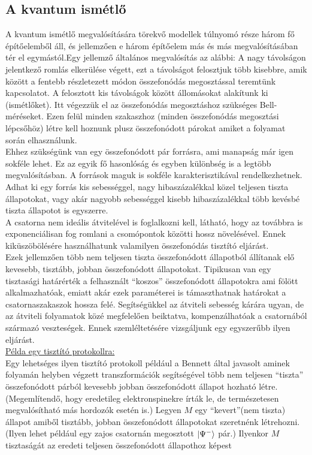 \subsection{A kvantum ismétlő}
A kvantum ismétlő megvalósítására törekvő modellek túlnyomó része három fő építőelemből áll, és jellemzően e három építőelem más és más megvalósításában tér el egymástól.Egy jellemző általános megvalósítás az alábbi:
A nagy távolságon jelentkező romlás elkerülése végett, ezt a távolságot felosztjuk több kisebbre, amik között a fentebb részletezett módon összefonódás megosztással teremtünk kapcsolatot. A felosztott kis távolságok között állomásokat alakítunk ki (ismétlőket). Itt végezzük el az összefonódás megosztáshoz szükséges Bell-méréseket. Ezen felül minden szakaszhoz (minden összefonódás megosztási lépcsőhöz) létre kell hoznunk plusz összefonódott párokat amiket a folyamat során elhasználunk.\\
 Ehhez szükségünk van egy összefonódott pár forrásra, ami manapság már igen sokféle lehet. %
Ez az egyik fő hasonlóság és egyben különbség is a legtöbb megvalósításban. A források maguk is sokféle karakterisztikával rendelkezhetnek. Adhat ki egy forrás kis sebességgel, nagy hibaszázalékkal közel teljesen tiszta állapotokat, vagy akár nagyobb sebességgel kisebb hibaszázalékkal több kevésbé tiszta állapotot is egyszerre.\\
 A csatorna nem ideális átvitelével is foglalkozni kell, látható, hogy az továbbra is exponenciálisan fog romlani a csomópontok közötti hossz növelésével. Ennek kiküszöbölésére használhatunk valamilyen összefonódás tisztító eljárást.\\
 Ezek jellemzően több nem teljesen tiszta összefonódott állapotból állítanak elő kevesebb, tisztább, jobban összefonódott állapotokat. Tipikusan van egy tisztasági határérték a felhasznált “koszos” összefonódott állapotokra ami fölött alkalmazhatóak, emiatt akár ezek paraméterei is támaszthatnak határokat a csatornaszakaszok hossza felé. Segítségükkel az átviteli sebesség kárára ugyan, de az átviteli folyamatok közé megfelelően beiktatva, kompenzálhatóak a csatornából származó veszteségek. Ennek szemléltetésére vizsgáljunk egy egyszerűbb ilyen eljárást.\\
\underline{Példa egy tisztító protokollra:}\\
Egy lehetséges ilyen tisztító protokoll például a Bennett által javasolt\cite{bennett1996purification} aminek folyamán helyben végzett transzformációk segítségével több nem teljesen “tiszta” összefonódott párból kevesebb jobban összefonódott állapot hozható létre. (Megemlítendő, hogy eredetileg elektronspinekre írták le, de természetesen megvalósítható más hordozók esetén is.) Legyen $M$ egy “kevert”(nem tiszta) állapot amiből tisztább, jobban összefonódott állapotokat szeretnénk létrehozni. (Ilyen lehet például egy zajos csatornán megosztott $ \ket{\Psi^-} $  pár.) Ilyenkor $M$ tisztaságát az eredeti teljesen összefonódott állapothoz képest 
